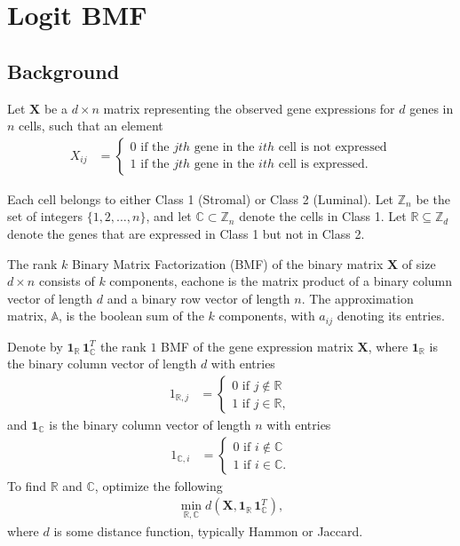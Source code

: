 \documentclass[12pt]{article}
\begin{document}
\newcommand{\cpos}{\text{\scriptsize{{\it POS}}}}
\newcommand{\cneg}{\text{\scriptsize{{\it NEG}}}}
\newcommand{\mb}{\mathbf}

\section{Logit BMF} \label{sec:LBMF} %

\subsection{Background} 
Let $\mathbf{X}$ be a $d \times n$ matrix representing the observed gene expressions for $d$ genes in $n$ cells, such that an element
\begin{align}
   X_{ij} & =    
   \begin{cases}
      0 \text{ if the $jth$ gene in the $ith$ cell is not expressed} \\
      1 \text{ if the $jth$ gene in the $ith$ cell is expressed}.
    \end{cases}
\end{align}

Each cell belongs to either Class 1 (Stromal) or Class 2 (Luminal).
Let $\mathbb{Z}_n$ be the set of integers $\{1, 2, \ldots, n\}$, and let $\mathbb{C} \subset \mathbb{Z}_n$ denote the cells in Class 1. 
Let $\mathbb{R} \subseteq \mathbb{Z}_d$ denote the genes that are expressed in Class 1 but not in Class 2. 

The rank $k$ Binary Matrix Factorization (BMF) of the binary matrix $\mathbf{X}$ of size $d \times n$ consists of $k$ components, eachone is the matrix product of a binary column vector of length $d$ and a binary row vector of length $n$. 
The approximation matrix, $\mathbb{A}$, is the boolean sum of the $k$ components, with $a_{ij}$ denoting its entries. 

Denote by $\mathbf{1}_{\mathbb{R}} \, \mathbf{1}_{\mathbb{C}}^T$ the rank $1$ BMF of the gene expression matrix $\mathbf{X}$, where $\mathbf{1}_{\mathbb{R}}$ is the binary column vector of length $d$ with entries
\begin{align}
   1_{\mathbb{R},j} & =    
   \begin{cases}
      0 \text{ if } j \notin \mathbb{R} \\
      1 \text{ if } j \in \mathbb{R},
    \end{cases}
\end{align}
and $\mathbf{1}_{\mathbb{C}}$ is the binary column vector of length $n$ with entries 
\begin{align}
   1_{\mathbb{C},i} & =    
   \begin{cases}
      0 \text{ if } i \notin \mathbb{C} \\
      1 \text{ if } i \in \mathbb{C}.
    \end{cases}
\end{align}
To find $\mathbb{R}$ and $\mathbb{C}$, optimize the following
\begin{align}
  \min_{\mathbb{R}, \mathbb{C}} d( \mathbf{X}, \mathbf{1}_{\mathbb{R}} \, \mathbf{1}_{\mathbb{C}}^T),
\end{align}
where $d$ is some distance function, typically Hammon or Jaccard. 
\end{document}

